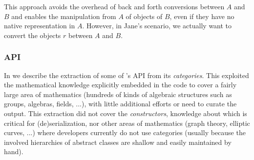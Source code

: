 This approach avoids the overhead of back and forth conversions between $A$ and $B$ and enables the manipulation from $A$ of objects of $B$, even if they have no native representation in $A$.
However, in Jane's scenario, we actually want to convert the objects $r$ between $A$ and $B$.


%

\subsubsection{API}

In \cite{DehKohKon:iop16} we describe the extraction of some of \Sage's API from its \emph{categories}.
This exploited the mathematical knowledge explicitly embedded in the code to cover a fairly large area  of mathematics (hundreds of kinds of algebraic structures such as groups, algebras, fields, ...), with little additional efforts or need to curate the output.
This extraction did not cover the \emph{constructors}, knowledge about
which is critical for (de)serialization, nor other areas of
mathematics (graph theory, elliptic curves, ...) where \Sage
developers currently do not use categories (usually because the
involved hierarchies of abstract classes are shallow and easily maintained by hand).

